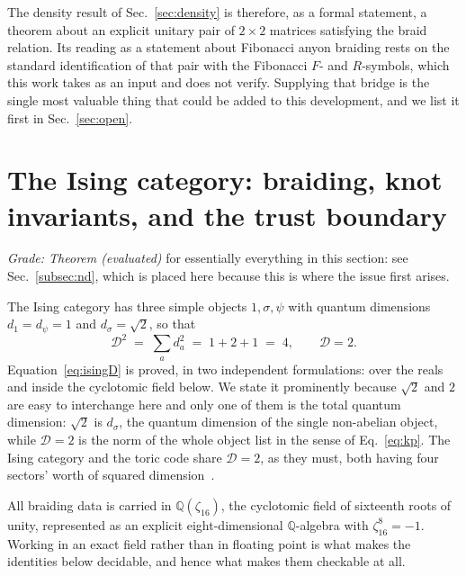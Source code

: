 \documentclass[aps,prx,nofootinbib,superscriptaddress,12pt]{revtex4-2}
\begin{document}
The density result of Sec.~\ref{sec:density} is therefore, as a formal
statement, a theorem about an explicit unitary pair of $2\times2$
matrices satisfying the braid relation. Its reading as a statement about
Fibonacci anyon braiding rests on the standard identification of that
pair with the Fibonacci $F$- and $R$-symbols, which this work takes as an
input and does not verify. Supplying that bridge is the single most
valuable thing that could be added to this development, and we list it
first in Sec.~\ref{sec:open}.

\section{The Ising category: braiding, knot invariants, and the trust boundary}
\label{sec:ising}

\emph{Grade: Theorem (evaluated)} for essentially everything in this
section: see Sec.~\ref{subsec:nd}, which is placed here because this
is where the issue first arises.

The Ising category has three simple objects $1, \sigma, \psi$ with
quantum dimensions $d_1 = d_\psi = 1$ and $d_\sigma = \sqrt2$, so that
\begin{equation}
\mathcal{D}^2 \;=\; \sum_a d_a^2 \;=\; 1 + 2 + 1 \;=\; 4 ,
\qquad \mathcal{D} = 2 .
\label{eq:isingD}
\end{equation}
Equation~\eqref{eq:isingD} is proved, in two independent
formulations: over the reals and inside the cyclotomic field below.
We state it prominently because $\sqrt2$ and $2$ are easy to interchange
here and only one of them is the total quantum dimension: $\sqrt2$ is
$d_\sigma$, the quantum dimension of the single non-abelian object, while
$\mathcal{D} = 2$ is the norm of the whole object list in the sense of
Eq.~\eqref{eq:kp}. The Ising category and the toric code share
$\mathcal{D} = 2$, as they must, both having four sectors' worth of
squared dimension~\cite{KitaevPreskill2006}.

All braiding data is carried in $\mathbb{Q}(\zeta_{16})$, the cyclotomic
field of sixteenth roots of unity, represented as an explicit
eight-dimensional $\mathbb{Q}$-algebra with $\zeta_{16}^8 = -1$. Working
in an exact field rather than in floating point is what makes the
identities below decidable, and hence what makes them checkable at all.
\end{document}

